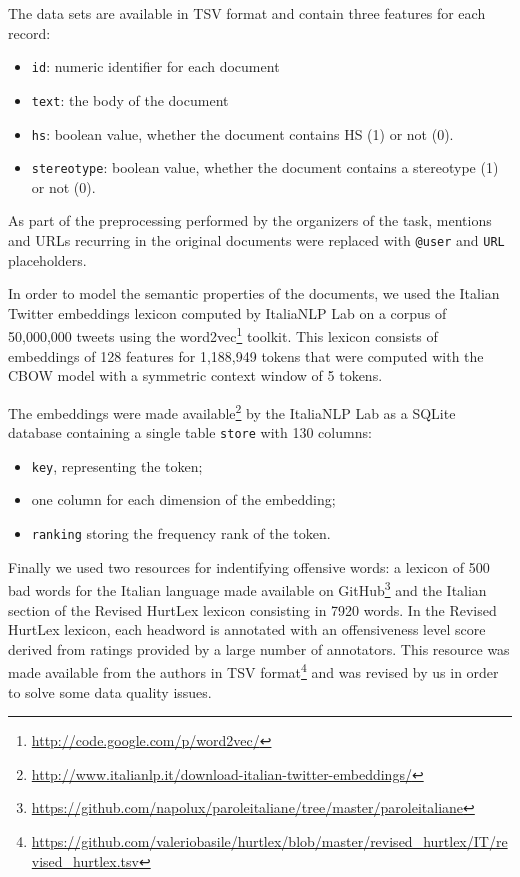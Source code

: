 \documentclass[a4paper, 9pt, twocolumn, DIV=calc]{scrartcl}
\begin{document}
The data sets are available in TSV format and contain three features for each record:
\begin{itemize}
    \item{\texttt{id}:} numeric identifier for each document
    \item{\texttt{text}:} the body of the document
    \item{\texttt{hs}:} boolean value, whether the document contains HS (1) or not (0).
    \item{\texttt{stereotype}:} boolean value, whether the document contains a stereotype (1) or not (0).
\end{itemize}

As part of the preprocessing performed by the organizers of the task, mentions and URLs recurring in the original documents were replaced with \texttt{@user} and \texttt{URL} placeholders.

In order to model the semantic properties of the documents, we used the Italian Twitter embeddings \cite{italian_twitter_embeddings} lexicon computed by ItaliaNLP Lab on a corpus of 50,000,000 tweets using the word2vec\footnote{\url{http://code.google.com/p/word2vec/}} toolkit.
This lexicon consists of embeddings of 128 features for 1,188,949 tokens that were computed with the CBOW model with a symmetric context window of 5 tokens.

The embeddings were made available\footnote{\url{http://www.italianlp.it/download-italian-twitter-embeddings/}} by the ItaliaNLP Lab as a SQLite database containing a single table \texttt{store} with 130 columns:
\begin{itemize}
    \item \texttt{key}, representing the token;
    \item one column for each dimension of the embedding;
    \item \texttt{ranking} storing the frequency rank of the token.
\end{itemize}

Finally we used two resources for indentifying offensive words: a lexicon of 500 bad words for the Italian language made available on GitHub\footnote{\url{https://github.com/napolux/paroleitaliane/tree/master/paroleitaliane}} and the Italian section of the Revised HurtLex lexicon \cite{hurtlex} consisting in 7920 words. In the Revised HurtLex lexicon, each headword is annotated with an offensiveness level score derived from ratings provided by a large number of annotators. This resource was made available from the authors in TSV format\footnote{\url{https://github.com/valeriobasile/hurtlex/blob/master/revised_hurtlex/IT/revised_hurtlex.tsv}} and was revised by us in order to solve some data quality issues.
\end{document}
